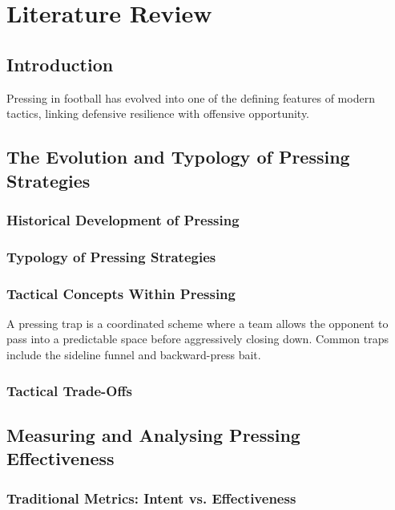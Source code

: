 \chapter{Literature Review}
\section{Introduction}
Pressing in football has evolved into one of the defining features of modern tactics, linking defensive resilience with offensive opportunity. 

\section{The Evolution and Typology of Pressing Strategies}

\subsection{Historical Development of Pressing}



\subsection{Typology of Pressing Strategies}



\subsection{Tactical Concepts Within Pressing}

\begin{tcolorbox}[title=Key Tactical Concept: Pressing Trap]
A pressing trap is a coordinated scheme where a team allows the opponent to pass into a predictable space before aggressively closing down. Common traps include the sideline funnel and backward-press bait.
\end{tcolorbox}


\subsection{Tactical Trade-Offs}

\section{Measuring and Analysing Pressing Effectiveness}

\subsection{Traditional Metrics: Intent vs. Effectiveness}


